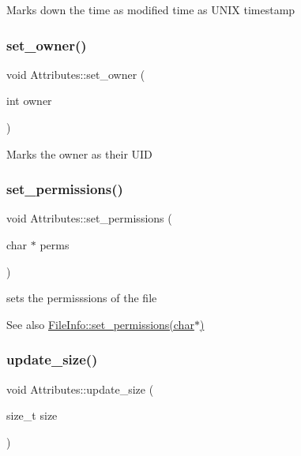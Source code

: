 Marks down the time as modified time as U\+N\+IX timestamp \mbox{\label{class_attributes_affdf3abb52a45ac3c9051bafd0da9e7e}} 
\subsubsection{\texorpdfstring{set\+\_\+owner()}{set\_owner()}}
{\footnotesize\ttfamily void Attributes\+::set\+\_\+owner (\begin{DoxyParamCaption}\item[{int}]{owner }\end{DoxyParamCaption})}

Marks the owner as their U\+ID \mbox{\label{class_attributes_aac8ca00f98b22280df69f62e42b72b8b}} 
\subsubsection{\texorpdfstring{set\+\_\+permissions()}{set\_permissions()}}
{\footnotesize\ttfamily void Attributes\+::set\+\_\+permissions (\begin{DoxyParamCaption}\item[{char $\ast$}]{perms }\end{DoxyParamCaption})}

sets the permisssions of the file \begin{DoxySeeAlso}{See also}
\mbox{\hyperlink{class_file_info_a377208012195dba0b24723837f6db39f}{File\+Info\+::set\+\_\+permissions(char$\ast$)}} 
\end{DoxySeeAlso}
\mbox{\label{class_attributes_a3983ec45af66e9b19367222092b7df6c}} 
\subsubsection{\texorpdfstring{update\+\_\+size()}{update\_size()}}
{\footnotesize\ttfamily void Attributes\+::update\+\_\+size (\begin{DoxyParamCaption}\item[{size\+\_\+t}]{size }\end{DoxyParamCaption})}

